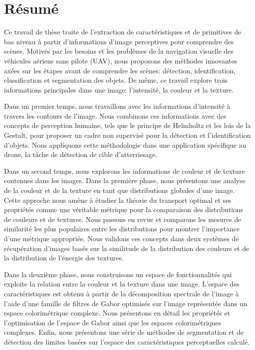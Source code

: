 \chapter*{Résumé}

\vspace*{-8ex}
\noindent Ce travail de thèse traite de l'extraction de caractéristiques et de primitives de bas niveau à partir d'informations d'image perceptives pour comprendre des scènes. Motivés par les besoins et les problèmes de la navigation visuelle des véhicules aériens sans pilote (UAV), nous proposons des méthodes innovantes axées sur les étapes avant de comprendre les scènes: détection, identification, classification et segmentation des objets. De même, ce travail explore trois informations principales dans une image: l'intensité, la couleur et la texture.
\newline 

\noindent Dans un premier temps, nous travaillons avec les informations d'intensité à travers les contours de l'image. Nous combinons ces informations avec des concepts de perception humaine, tels que le principe de Helmholtz et les lois de la Gestalt, pour proposer un cadre non supervisé pour la détection et l'identification d'objets. Nous appliquons cette méthodologie dans une application spécifique au drone, la tâche de détection de cible d'atterrissage.
\newline 

\noindent Dans un second temps, nous explorons les informations de couleur et de texture contenues dans les images. Dans la première phase, nous présentons une analyse de la couleur et de la texture en tant que distributions globales d'une image. Cette approche nous amène à étudier la théorie du transport optimal et ses propriétés comme une véritable métrique pour la comparaison des distributions de couleurs et de textures. Nous passons en revue et comparons les mesures de similarité les plus populaires entre les distributions pour montrer l'importance d'une métrique appropriée. Nous validons ces concepts dans deux systèmes de récupération d'images basés sur la similitude de la distribution des couleurs et de la distribution de l'énergie des textures.

\noindent Dans la deuxième phase, nous construisons un espace de fonctionnalités qui exploite la relation entre la couleur et la texture dans une image. L'espace des caractéristiques est obtenu à partir de la décomposition spectrale de l'image à l'aide d'une famille de filtres de Gabor optimisés sur l'image représentée dans un espace colorimétrique complexe. Nous présentons en détail les propriétés et l'optimisation de l'espace de Gabor ainsi que les espaces colorimétriques complexes. Enfin, nous présentons une série de méthodes de segmentation et de détection des limites basées sur l'espace des caractéristiques perceptuelles calculé.

